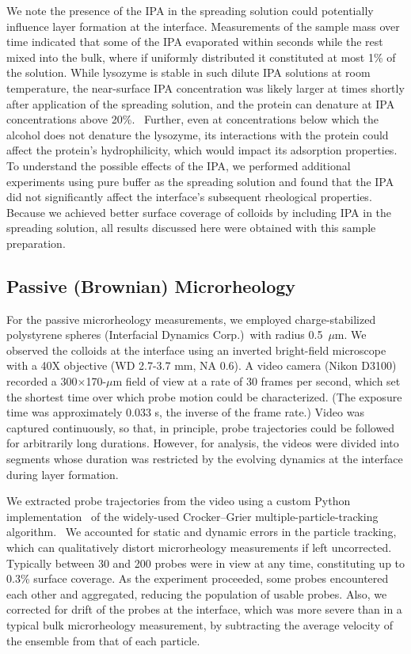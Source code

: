 We note the presence of the IPA in the spreading solution could potentially influence layer formation at the interface.  Measurements of the sample mass over time indicated that some of the IPA evaporated within seconds while the rest mixed into the bulk, where if uniformly distributed it constituted at most 1\% of the solution.  While lysozyme is stable in such dilute IPA solutions at room temperature, the near-surface IPA concentration was likely larger at times shortly after application of the spreading solution, and the protein can denature at IPA concentrations above 20\%.~\cite{Velicelebi1979}  Further, even at concentrations below which the alcohol does not denature the lysozyme, its interactions with the protein could affect the protein's hydrophilicity, which would impact its adsorption properties.  To understand the possible effects of the IPA, we performed additional experiments using pure buffer as the spreading solution and found that the IPA did not significantly affect the interface's subsequent rheological properties.  Because we achieved better surface coverage of colloids by including IPA in the spreading solution, all results discussed here were obtained with this sample preparation. 

\subsection{Passive (Brownian) Microrheology}

For the passive microrheology measurements, we employed charge-stabilized polystyrene spheres (Interfacial Dynamics Corp.)~with radius 0.5~$\mu \text{m}$. We observed the colloids at the interface using an inverted bright-field microscope with a 40X objective (WD 2.7-3.7 mm, NA 0.6). A video camera (Nikon D3100) recorded a 300$\times$170-$\mu$m field of view at a rate of 30 frames per second, which set the shortest time over which probe motion could be characterized. (The exposure time was approximately 0.033 s, the inverse of the frame rate.)  Video was captured continuously, so that, in principle, probe trajectories could be followed for arbitrarily long durations. However, for analysis, the videos were divided into segments whose duration was restricted by the evolving dynamics at the interface during layer formation.

We extracted probe trajectories from the video using a custom Python implementation~\cite{trackpy} of the widely-used Crocker--Grier multiple-particle-tracking algorithm.~\cite{Crocker1996} 
We accounted for static and dynamic errors in the particle tracking, which can qualitatively distort microrheology measurements if left uncorrected.\cite{Savin2005}
Typically between 30 and 200 probes were in view at any time, constituting up to 0.3\% surface coverage. As the experiment proceeded, some probes encountered each other and aggregated, reducing the population of usable probes.  Also, we corrected for drift of the probes at the interface, which was more severe than in a typical bulk microrheology measurement, by subtracting the average velocity of the ensemble from that of each particle.

